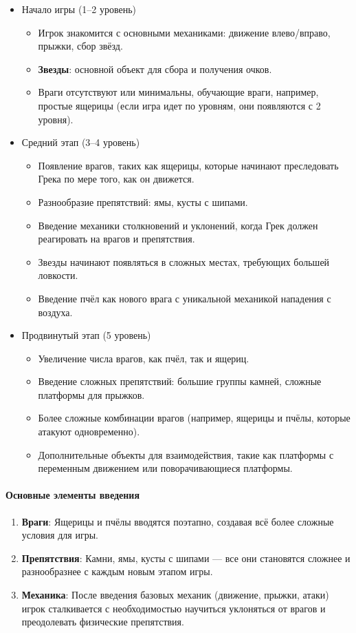 \documentclass{article}
\begin{document}
\begin{itemize}

\item{Начало игры (1--2 уровень)}
\begin{itemize}
    \item Игрок знакомится с основными механиками: движение влево/вправо, прыжки, сбор звёзд.
    \item \textbf{Звезды}: основной объект для сбора и получения очков.
    \item Враги отсутствуют или минимальны, обучающие враги, например, простые ящерицы (если игра идет по уровням, они появляются с 2 уровня).
\end{itemize}

\item{Средний этап (3--4 уровень)}
\begin{itemize}
    \item Появление врагов, таких как ящерицы, которые начинают преследовать Грека по мере того, как он движется.
    \item Разнообразие препятствий: ямы, кусты с шипами.
    \item Введение механики столкновений и уклонений, когда Грек должен реагировать на врагов и препятствия.
    \item Звезды начинают появляться в сложных местах, требующих большей ловкости.
    \item Введение пчёл как нового врага с уникальной механикой нападения с воздуха.
\end{itemize}

\item{Продвинутый этап (5 уровень)}
\begin{itemize}
    \item Увеличение числа врагов, как пчёл, так и ящериц.
    \item Введение сложных препятствий: большие группы камней, сложные платформы для прыжков.
    \item Более сложные комбинации врагов (например, ящерицы и пчёлы, которые атакуют одновременно).
    \item Дополнительные объекты для взаимодействия, такие как платформы с переменным движением или поворачивающиеся платформы.
\end{itemize}
\end{itemize}

\paragraph{Основные элементы введения}
\begin{enumerate}
    \item \textbf{Враги}: Ящерицы и пчёлы вводятся поэтапно, создавая всё более сложные условия для игры.
    \item \textbf{Препятствия}: Камни, ямы, кусты с шипами — все они становятся сложнее и разнообразнее с каждым новым этапом игры.
    \item \textbf{Механика}: После введения базовых механик (движение, прыжки, атаки) игрок сталкивается с необходимостью научиться уклоняться от врагов и преодолевать физические препятствия.
\end{enumerate}
\end{document}
